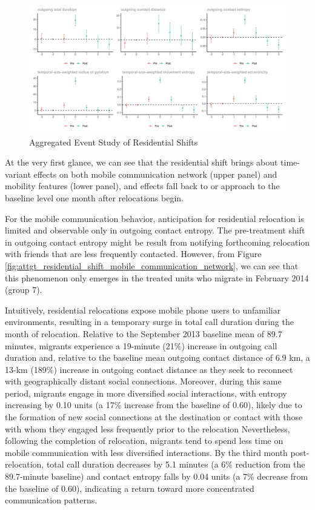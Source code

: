\begin{figure}[h!]
\centering
\caption{Aggregated Event Study of Residential Shifts}
\vspace{0.1cm}

\includegraphics[scale=0.49]{figures/csdid/residential_shift.png}

\label{fig:event_study_residential_shift}
\end{figure}

At the very first glance, we can see that the residential shift brings about time-variant effects on both mobile communication network (upper panel) and mobility features (lower panel), and effects fall back to or approach to the baseline level one month after relocations begin.

For the mobile communication behavior, anticipation for residential relocation is limited and observable only in outgoing contact entropy.
The pre-treatment shift in outgoing contact entropy might be result from notifying forthcoming relocation with friends that are less frequently contacted.
However, from Figure \ref{fig:attgt_residential_shift_mobile_communication_network}, we can see that this phenomenon only emerges in the treated units who migrate in February 2014 (group 7).

Intuitively, residential relocations expose mobile phone users to unfamiliar environments, resulting in a temporary surge in total call duration during the month of relocation. Relative to the September 2013 baseline mean of 89.7 minutes, migrants experience a 19-minute (21\%) increase in outgoing call duration and, relative to the baseline mean outgoing contact distance of 6.9 km, a 13-km (189\%) increase in outgoing contact distance as they seek to reconnect with geographically distant social connections.
Moreover, during this same period, migrants engage in more diversified social interactions, with entropy increasing by 0.10 units (a 17\% increase from the baseline of 0.60), likely due to the formation of new social connections at the destination or contact with those with whom they engaged less frequently prior to the relocation
Nevertheless, following the completion of relocation, migrants tend to spend less time on mobile communication with less diversified interactions. By the third month post-relocation, total call duration decreases by 5.1 minutes (a 6\% reduction from the 89.7-minute baseline) and contact entropy falls by 0.04 units (a 7\% decrease from the baseline of 0.60), indicating a return toward more concentrated communication patterns.


